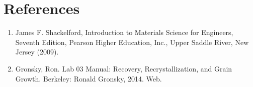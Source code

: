 \documentclass{article}
\begin{document}

\section{References}
\begin{enumerate}
\item James F. Shackelford, Introduction to Materials Science for Engineers, Seventh Edition, Pearson Higher 
Education, Inc., Upper Saddle River, New Jersey (2009).
\item Gronsky, Ron. Lab 03 Manual: Recovery, Recrystallization, and Grain Growth. Berkeley: Ronald Gronsky, 2014. Web.
\end{enumerate}








\end{document}
